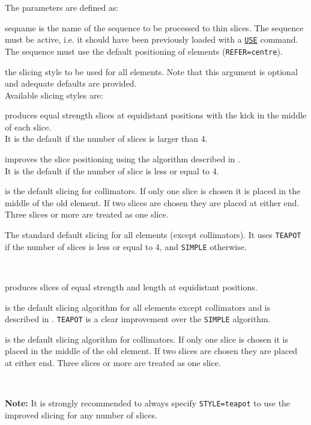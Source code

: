 The parameters are defined as: 
\begin{madlist}
    seqname is the name of the sequence to be
   processed to thin slices. The sequence must be active, i.e. it should
   have been previously loaded with a \hyperref[sec:use]{\tt USE} command.  
   The sequence must use the default positioning of elements ({\tt REFER=centre}).

    the slicing style to be used for all elements. 
   Note that this argument is optional and adequate defaults are provided.\\
   Available slicing styles are: 

\begin{5.02.04}
     \begin{madlist}
       produces equal strength slices at equidistant
     positions with the kick in the middle of each slice. \\ 
     It is the default if the number of slices is larger than 4. 

      improves the slice positioning using the algorithm
     described in \cite{burkhardt2013}.\\
     It is the default if the number of slice is less or equal to 4.

      is the default slicing for collimators. If only
     one slice is chosen it is placed in the middle of the old
     element. If two slices are chosen they are placed at either
     end. Three slices or more are treated as one slice.      

      The standard default slicing for all
     elements (except collimators). It uses {\tt TEAPOT} if the number
     of slices is less or equal to 4, and {\tt SIMPLE} otherwise.
     \end{madlist}
\end{5.02.04}\\
\begin{5.02.05}
     \begin{madlist}
     	 produces slices of equal strength and length at equidistant
     	positions.
     	
     	 is the default slicing algorithm for all elements 
     	except collimators and is described in \cite{burkhardt2013}. 
     	{\tt TEAPOT} is a clear improvement over the {\tt SIMPLE} algorithm.
     	
     	 is the default slicing algorithm for collimators. 
     	If only one slice is chosen it is placed in the middle of the old
     	element. If two slices are chosen they are placed at either
     	end. Three slices or more are treated as one slice. 
     \end{madlist}
\end{5.02.05}
\\
\begin{5.02.04}
   \textbf{Note:} It is strongly recommended to always specify
   {\tt STYLE=teapot} to use the improved slicing for any number of
   slices. 
\\ \end{5.02.04}
      

\end{madlist}
